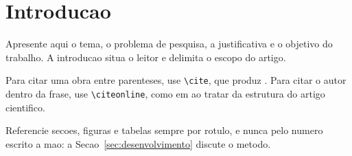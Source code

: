 \section{Introducao}
\label{sec:introducao}

Apresente aqui o tema, o problema de pesquisa, a justificativa e o objetivo
do trabalho. A introducao situa o leitor e delimita o escopo do artigo.

Para citar uma obra entre parenteses, use \verb|\cite|, que produz
\cite{abntex2}. Para citar o autor dentro da frase, use \verb|\citeonline|,
como em  ao tratar da estrutura do artigo cientifico.

Referencie secoes, figuras e tabelas sempre por rotulo, e nunca pelo numero
escrito a mao: a Secao~\ref{sec:desenvolvimento} discute o metodo.
